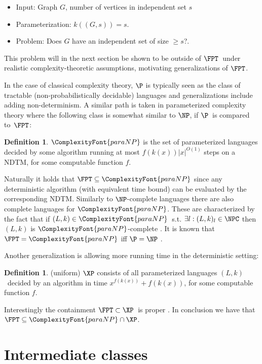\documentclass[a4paper,11pt]{report}
\theoremstyle{plain}
\theoremstyle{definition}
\newtheorem{defn}[thm]{Definition} %
\newcommand{\PARANP}{\ComplexityFont{paraNP}}
\begin{document}
\begin{itemize}
\item Input: Graph $G$, number of vertices in independent set $s$
\item Parameterization: $k((G, s)) = s$.
\item Problem: Does $G$ have an independent set of size $\ge s$?.
\end{itemize}

This problem will in the next section be shown to be outside of $\FPT$ under realistic complexity-theoretic assumptions, motivating generalizations of $\FPT$.

In the case of classical complexity theory, $\P$ is typically seen as the class of tractable (non-probabilistically decidable) languages and generalizations include adding non-determinism.
A similar path is taken in parameterized complexity theory where the following class is somewhat similar to $\NP$, if $\P$ is compared to $\FPT$:

\begin{defn}
$\PARANP$ is the set of parameterized languages decided by some algorithm running at most $f(k(x)) |x|^{O(1)}$ steps on a NDTM, for some computable function $f$.
\end{defn}

Naturally it holds that $\FPT \subseteq \PARANP$ since any deterministic algorithm (with equivalent time bound) can be evaluated by the corresponding NDTM.
Similarly to $\NP$-complete languages there are also complete languages for $\PARANP$.
These are characterized by the fact that if $(L, k) \in \PARANP$ s.t. $\exists l : (L, k)_l \in \NPC$ then $(L, k)$ is $\PARANP$-complete \cite{FG06}.
It is known that $\FPT = \PARANP$ iff $\P = \NP$ \cite{FG06}.

Another generalization is allowing more running time in the deterministic setting:

\begin{defn}
(uniform) $\XP$ consists of all parameterized languages $(L, k)$ decided by an algorithm in time
$x^{f(k(x))} + f(k(x))$, for some computable function $f$.
\end{defn}


Interestingly the containment $\FPT \subset \XP$ is proper \cite{FG06}.
In conclusion we have that $\FPT \subseteq \PARANP \cap \XP$.

\section{Intermediate classes}
\end{document}
